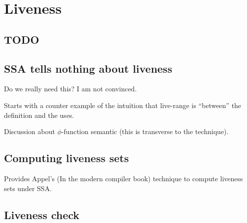 \chapter{Liveness }
\label{chapter:ssa_tells_nothing_of_liveness}

\section{TODO}

\section{SSA tells nothing about liveness}
Do we really need this? I am not convinced.

Starts with a counter example of the intuition that live-range is ``between'' the definition and the uses. 

Discussion about $\phi$-function semantic (this is transverse to the technique).

\section{Computing liveness sets}
Provides Appel's (In the modern compiler book) technique to compute liveness sets under SSA.

\section{Liveness check}
